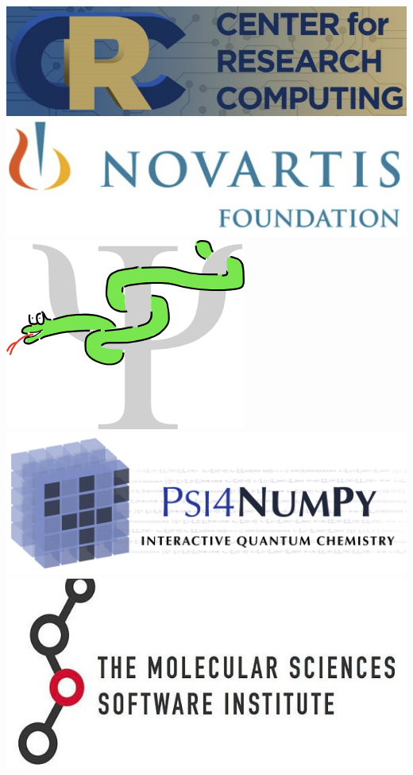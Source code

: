 \documentclass{beamer}
\begin{document}
\begin{frame}
\begin{columns}
\begin{minipage}{1.0\linewidth}
      \includegraphics[width=0.85\linewidth,keepaspectratio]{./figures/logo_crc.jpg}
      \includegraphics[width=0.95\linewidth,keepaspectratio]{./figures/logo_novartis.png}
      \includegraphics[scale=0.15]{./figures/logo_cclib.png}
      \includegraphics[width=1.00\linewidth,keepaspectratio]{./figures/psi4numpybanner_eqn.png}
      \includegraphics[width=0.95\linewidth,keepaspectratio]{./figures/logo_molssi_text.jpg}
    \end{minipage}
  \end{columns}
\end{frame}
\end{document}
